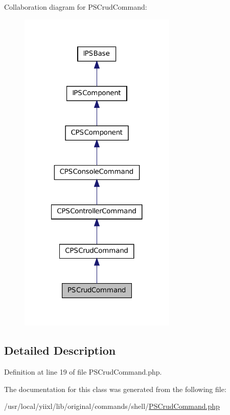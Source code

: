 Collaboration diagram for PSCrudCommand:\nopagebreak
\begin{figure}[H]
\begin{center}
\leavevmode
\includegraphics[width=212pt]{classPSCrudCommand__coll__graph}
\end{center}
\end{figure}


\subsection{Detailed Description}


Definition at line 19 of file PSCrudCommand.php.



The documentation for this class was generated from the following file:\begin{DoxyCompactItemize}
\item 
/usr/local/yiixl/lib/original/commands/shell/\hyperlink{PSCrudCommand_8php}{PSCrudCommand.php}\end{DoxyCompactItemize}
